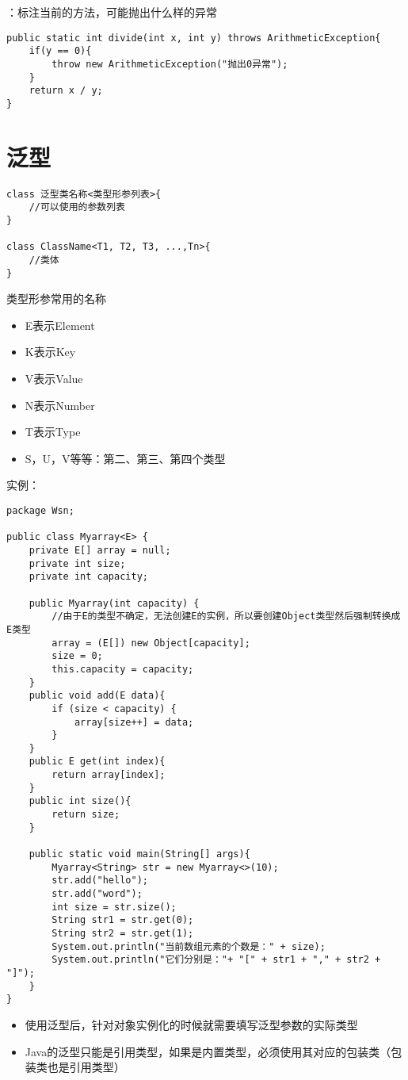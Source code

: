 \documentclass[a4paper]{report}
\begin{document}
：标注当前的方法，可能抛出什么样的异常
\begin{lstlisting}
public static int divide(int x, int y) throws ArithmeticException{
    if(y == 0){
        throw new ArithmeticException("抛出0异常");
    }
    return x / y;
}
\end{lstlisting}
\section{泛型}
\begin{lstlisting}
class 泛型类名称<类型形参列表>{
    //可以使用的参数列表
}

class ClassName<T1, T2, T3, ...,Tn>{
    //类体
}
\end{lstlisting}
类型形参常用的名称
\begin{itemize}
\itemsep=0pt \parskip =0pt
\item E表示Element
\item K表示Key
\item V表示Value
\item N表示Number
\item T表示Type
\item S，U，V等等：第二、第三、第四个类型
\end{itemize}

实例：

\begin{lstlisting}
package Wsn;

public class Myarray<E> {
    private E[] array = null;
    private int size;
    private int capacity;

    public Myarray(int capacity) {
        //由于E的类型不确定，无法创建E的实例，所以要创建Object类型然后强制转换成E类型
        array = (E[]) new Object[capacity];
        size = 0;
        this.capacity = capacity;
    }
    public void add(E data){
        if (size < capacity) {
            array[size++] = data;
        }
    }
    public E get(int index){
        return array[index];
    }
    public int size(){
        return size;
    }

    public static void main(String[] args){
        Myarray<String> str = new Myarray<>(10);
        str.add("hello");
        str.add("word");
        int size = str.size();
        String str1 = str.get(0);
        String str2 = str.get(1);
        System.out.println("当前数组元素的个数是：" + size);
        System.out.println("它们分别是："+ "[" + str1 + "," + str2 + "]");
    }
}
\end{lstlisting}
\begin{itemize}
\itemsep=0pt \parskip =0pt
\item 使用泛型后，针对对象实例化的时候就需要填写泛型参数的实际类型
\item Java的泛型只能是引用类型，如果是内置类型，必须使用其对应的包装类（包装类也是引用类型）
\end{itemize}
\end{document}
